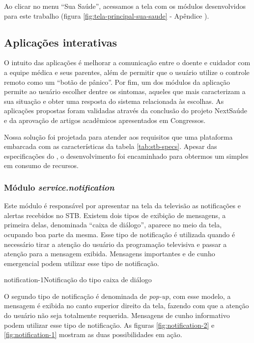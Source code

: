 Ao clicar no menu ``Sua Saúde'', acessamos a tela com os módulos desenvolvidos
para este trabalho (figura \ref{fig:tela-principal-sua-saude} - Apêndice 
).

\subsection{Aplicações interativas} \label{subsec:aplicacoes-tv-health}

O intuito das aplicações é melhorar a comunicação entre o doente e cuidador com
a equipe médica e seus parentes, além de permitir que o usuário utilize o
controle remoto como um ``botão de pânico''. Por fim, um dos módulos da
aplicação permite ao usuário escolher dentre os sintomas, aqueles que mais
caracterizam a sua situação e obter uma resposta do sistema relacionada às
escolhas. As aplicações  propostas foram validadas através da conclusão do
projeto NextSaúde e da aprovação de artigos acadêmicos apresentados em
Congressos.

Nossa solução foi projetada para atender aos requisitos que uma plataforma
embarcada com as características da tabela \ref{tab:stb-specs}. Apesar das 
especificações do \hardware[], o desenvolvimento foi encaminhado para 
obtermos um \software[] simples em consumo de recursos.

\subsubsection{Módulo \textit{service.notification}}\label{subsubsec:notification}

Este módulo é responsável por apresentar na tela da televisão as notificações e
alertas recebidos no STB. Existem dois tipos de exibição de mensagens, a
primeira delas, denominada ``caixa de diálogo'', aparece no meio da tela,
ocupando boa parte da mesma. Esse tipo de notificação é utilizada quando é
necessário tirar a atenção do usuário da programação televisiva e passar a
atenção para a mensagem exibida. Mensagens importantes e de cunho emergencial
podem utilizar esse tipo de notificação.   

{notification-1}{Notificação do tipo caixa de diálogo}

O segundo tipo de notificação é denominada de \textit{pop-up}, com esse modelo,
a mensagem é exibida no canto superior direito da tela, fazendo com que a
atenção do usuário não seja totalmente requerida. Mensagens de cunho informativo
podem utilizar esse tipo de notificação. As figuras \ref{fig:notification-2} e
\ref{fig:notification-1}  mostram as duas possibilidades em ação.

